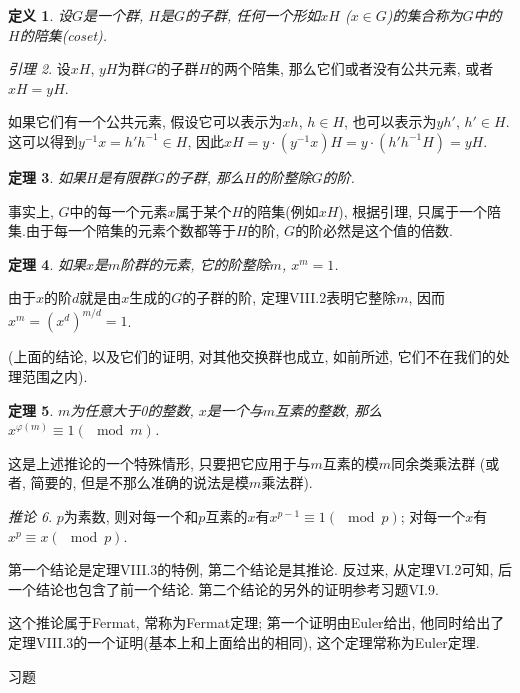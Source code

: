 \documentclass[12pt,a4paper]{book} %
\newtheorem{theorem}{定理}
\newtheorem{definition}[theorem]{定义}
\theoremstyle{remark}
\theoremstyle{example}
\theoremstyle{lemma}
\newtheorem{lemma}[theorem]{引理}
\theoremstyle{corollary}
\newtheorem{corollary}[theorem]{推论}
\numberwithin{theorem}{chapter}
\begin{document}
\begin{definition}
设$G$是一个群, $H$是$G$的子群, 任何一个形如$xH$ ($x \in G$)的集合称为$G$中的$H$的陪集(coset).
\end{definition}

\begin{lemma}
设$xH$, $yH$为群$G$的子群$H$的两个陪集, 那么它们或者没有公共元素, 或者$xH = yH$.
\end{lemma}

如果它们有一个公共元素, 假设它可以表示为$xh$, $h \in H$, 也可以表示为$yh'$, $h' \in H$. 这可以得到$y^{-1}x = h' h^{-1} \in H$, 因此$xH = y \cdot (y^{-1}x)H = y \cdot (h' h^{-1}H) = yH$.

\begin{theorem}
如果$H$是有限群$G$的子群, 那么$H$的阶整除$G$的阶.
\end{theorem}

事实上, $G$中的每一个元素$x$属于某个$H$的陪集(例如$xH$), 根据引理, 只属于一个陪集.由于每一个陪集的元素个数都等于$H$的阶, $G$的阶必然是这个值的倍数.

\begin{theorem}
如果$x$是$m$阶群的元素, 它的阶整除$m$, $x^m = 1$.
\end{theorem}

由于$x$的阶$d$就是由$x$生成的$G$的子群的阶, 定理VIII.2表明它整除$m$, 因而$x^m = (x^d)^{m / d} = 1$.

(上面的结论, 以及它们的证明, 对其他交换群也成立, 如前所述, 它们不在我们的处理范围之内).

\begin{theorem}
$m$为任意大于0的整数, $x$是一个与$m$互素的整数, 那么$x^{\varphi(m)} \equiv 1 (\mod m)$.
\end{theorem}

这是上述推论的一个特殊情形, 只要把它应用于与$m$互素的模$m$同余类乘法群 (或者, 简要的, 但是不那么准确的说法是模$m$乘法群).

\begin{corollary}
$p$为素数, 则对每一个和$p$互素的$x$有$x^{p - 1} \equiv 1 (\mod p)$; 对每一个$x$有$x^p \equiv x (\mod p)$.
\end{corollary}

第一个结论是定理VIII.3的特例, 第二个结论是其推论. 反过来, 从定理VI.2可知, 后一个结论也包含了前一个结论. 第二个结论的另外的证明参考习题VI.9.

这个推论属于Fermat, 常称为Fermat定理; 第一个证明由Euler给出, 他同时给出了定理VIII.3的一个证明(基本上和上面给出的相同), 这个定理常称为Euler定理.

习题
\end{document}
